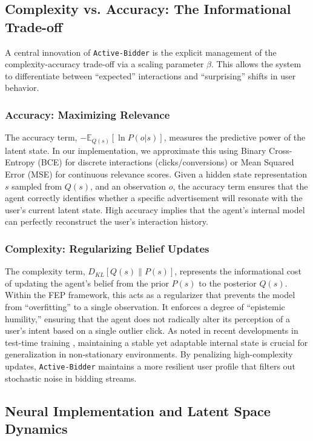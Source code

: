 \subsection{Complexity vs. Accuracy: The Informational Trade-off}

A central innovation of \texttt{Active-Bidder} is the explicit management of the complexity-accuracy trade-off via a scaling parameter $\beta$. This allows the system to differentiate between ``expected'' interactions and ``surprising'' shifts in user behavior.

\subsubsection{Accuracy: Maximizing Relevance}
The accuracy term, $-\mathbb{E}_{Q(s)} [\ln P(o|s)]$, measures the predictive power of the latent state. In our implementation, we approximate this using Binary Cross-Entropy (BCE) for discrete interactions (clicks/conversions) or Mean Squared Error (MSE) for continuous relevance scores. Given a hidden state representation $s$ sampled from $Q(s)$, and an observation $o$, the accuracy term ensures that the agent correctly identifies whether a specific advertisement will resonate with the user's current latent state. High accuracy implies that the agent's internal model can perfectly reconstruct the user's interaction history.

\subsubsection{Complexity: Regularizing Belief Updates}
The complexity term, $D_{KL}[Q(s) \parallel P(s)]$, represents the informational cost of updating the agent's belief from the prior $P(s)$ to the posterior $Q(s)$. Within the FEP framework, this acts as a regularizer that prevents the model from ``overfitting'' to a single observation. It enforces a degree of ``epistemic humility,'' ensuring that the agent does not radically alter its perception of a user's intent based on a single outlier click. As noted in recent developments in test-time training \citep{sun2024learning}, maintaining a stable yet adaptable internal state is crucial for generalization in non-stationary environments. By penalizing high-complexity updates, \texttt{Active-Bidder} maintains a more resilient user profile that filters out stochastic noise in bidding streams.

\subsection{Neural Implementation and Latent Space Dynamics}

